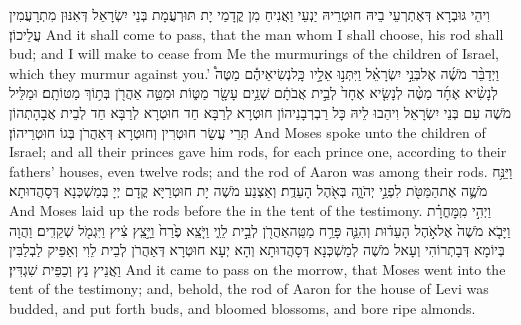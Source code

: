 {וִיהֵי גּוּבְרָא דְּאֶתְרְעֵי בֵיהּ חוּטְרֵיהּ יַנְעֵי וַאֲנִיחַ מִן קֳדָמַי יָת תּוּרְעֲמָת בְּנֵי יִשְׂרָאֵל דְּאִנּוּן מִתְרָעֲמִין עֲלֵיכוֹן׃}
{And it shall come to pass, that the man whom I shall choose, his rod shall bud; and I will make to cease from Me the murmurings of the children of Israel, which they murmur against you.’}{}
{וַיְדַבֵּ֨ר מֹשֶׁ֜ה אֶל\maqqaf בְּנֵ֣י יִשְׂרָאֵ֗ל וַיִּתְּנ֣וּ אֵלָ֣יו \pasek  כָּֽל\maqqaf נְשִׂיאֵיהֶ֡ם מַטֶּה֩ לְנָשִׂ֨יא אֶחָ֜ד מַטֶּ֨ה לְנָשִׂ֤יא אֶחָד֙ לְבֵ֣ית אֲבֹתָ֔ם שְׁנֵ֥ים עָשָׂ֖ר מַטּ֑וֹת וּמַטֵּ֥ה אַהֲרֹ֖ן בְּת֥וֹךְ מַטּוֹתָֽם׃}
{וּמַלֵּיל מֹשֶׁה עִם בְּנֵי יִשְׂרָאֵל וִיהַבוּ לֵיהּ כָּל רַבְרְבָנֵיהוֹן חוּטְרָא לְרַבָּא חַד חוּטְרָא לְרַבָּא חַד לְבֵית אֲבָהָתְהוֹן תְּרֵי עֲשַׂר חוּטְרִין וְחוּטְרָא דְּאַהֲרֹן בְּגוֹ חוּטְרֵיהוֹן׃}
{And Moses spoke unto the children of Israel; and all their princes gave him rods, for each prince one, according to their fathers’ houses, even twelve rods; and the rod of Aaron was among their rods.}{}
{וַיַּנַּ֥ח מֹשֶׁ֛ה אֶת\maqqaf הַמַּטֹּ֖ת לִפְנֵ֣י יְהֹוָ֑ה בְּאֹ֖הֶל הָעֵדֻֽת׃}
{וְאַצְנַע מֹשֶׁה יָת חוּטְרַיָּא קֳדָם יְיָ בְּמַשְׁכְּנָא דְּסָהֲדוּתָא׃}
{And Moses laid up the rods before the \lord\space in the tent of the testimony.}{}
{וַיְהִ֣י מִֽמׇּחֳרָ֗ת וַיָּבֹ֤א מֹשֶׁה֙ אֶל\maqqaf אֹ֣הֶל הָעֵד֔וּת וְהִנֵּ֛ה פָּרַ֥ח מַטֵּֽה\maqqaf אַהֲרֹ֖ן לְבֵ֣ית לֵוִ֑י וַיֹּ֤צֵֽא פֶ֙רַח֙ וַיָּ֣צֵֽץ צִ֔יץ וַיִּגְמֹ֖ל שְׁקֵדִֽים׃}
{וַהֲוָה בְּיוֹמָא דְּבָתְרוֹהִי וְעָאל מֹשֶׁה לְמַשְׁכְּנָא דְּסָהֲדוּתָא וְהָא יְעָא חוּטְרָא דְּאַהֲרֹן לְבֵית לֵוִי וְאַפֵּיק לַבְלַבִּין וַאֲנֵיץ נַץ וְכַפֵּית שִׁגְדִּין׃}
{And it came to pass on the morrow, that Moses went into the tent of the testimony; and, behold, the rod of Aaron for the house of Levi was budded, and put forth buds, and bloomed blossoms, and bore ripe almonds.}{}
